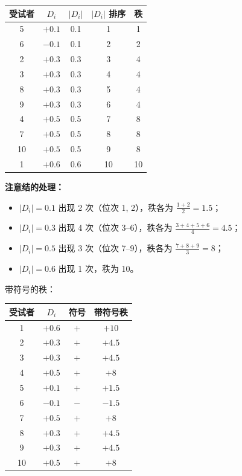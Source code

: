 \begin{example}
\begin{center}
\begin{tabular}{c|c|c|c|c}
    \toprule
    受试者 & $D_i$ & $|D_i|$ & $|D_i|$ 排序 & 秩 \\
    \midrule
    5  & $+0.1$ & 0.1 & 1 & 1 \\
    6  & $-0.1$ & 0.1 & 2 & 2 \\
    2  & $+0.3$ & 0.3 & 3 & 4 \\
    3  & $+0.3$ & 0.3 & 4 & 4 \\
    8  & $+0.3$ & 0.3 & 5 & 4 \\
    9  & $+0.3$ & 0.3 & 6 & 4 \\
    4  & $+0.5$ & 0.5 & 7 & 8 \\
    7  & $+0.5$ & 0.5 & 8 & 8 \\
    10 & $+0.5$ & 0.5 & 9 & 8 \\
    1  & $+0.6$ & 0.6 & 10 & 10 \\
    \bottomrule
\end{tabular}
\end{center}

\textbf{注意结的处理：}
\begin{itemize}
    \item $|D_i| = 0.1$ 出现 2 次（位次 1, 2），秩各为 $\frac{1+2}{2} = 1.5$；
    \item $|D_i| = 0.3$ 出现 4 次（位次 3--6），秩各为 $\frac{3+4+5+6}{4} = 4.5$；
    \item $|D_i| = 0.5$ 出现 3 次（位次 7--9），秩各为 $\frac{7+8+9}{3} = 8$；
    \item $|D_i| = 0.6$ 出现 1 次，秩为 10。
\end{itemize}

带符号的秩：

\begin{center}
\begin{tabular}{c|c|c|c}
    \toprule
    受试者 & $D_i$ & 符号 & 带符号秩 \\
    \midrule
    1  & $+0.6$ & $+$ & $+10$ \\
    2  & $+0.3$ & $+$ & $+4.5$ \\
    3  & $+0.3$ & $+$ & $+4.5$ \\
    4  & $+0.5$ & $+$ & $+8$ \\
    5  & $+0.1$ & $+$ & $+1.5$ \\
    6  & $-0.1$ & $-$ & $-1.5$ \\
    7  & $+0.5$ & $+$ & $+8$ \\
    8  & $+0.3$ & $+$ & $+4.5$ \\
    9  & $+0.3$ & $+$ & $+4.5$ \\
    10 & $+0.5$ & $+$ & $+8$ \\
    \bottomrule
\end{tabular}
\end{center}


\end{example}
